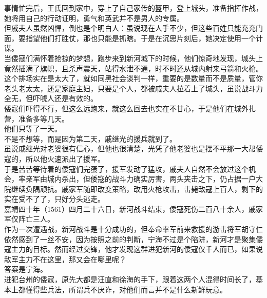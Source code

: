 \begin{multicols}{\theparacolNo}
事情忙完后，王氏回到家中，穿上了自己家传的盔甲，登上城头，准备指挥作战，她将用自己的行动证明，勇气和英武并不是男人的专属。\\

但戚夫人虽然凶悍，倒也是个明白人：虽说现在人手不少，但这些百姓只能充充门面，要指望他们打胜仗，那也只能是抓瞎。于是在沉思片刻后，她决定使用一个计谋。\\

当倭寇们满怀着抢掠的梦想，跑步来到新河城下的时候，他们惊奇地发现，城头上竟然插满了旗帜，且杀声震天，站得水泄不通，时不时还从城内射来弓箭和火枪。\\

这个排场实在是太大了，就如同黑社会谈判一样，重要的是数量而不是质量，管你老头老太太，还是家庭主妇，只要是个人，都被戚夫人拉着上了城头，虽说战斗力全无，但吓唬人还是有效的。\\

倭寇们吓得不行，但这么远跑来，就这么回去也实在不甘心，于是他们在城外扎营，准备多等几天。\\

他们只等了一天。\\

不是不想等，而是因为第二天，戚继光的援兵就到了。\\

虽说戚继光对老婆很有信心，但他也很清楚，光凭了他老婆也是摆不平那一大帮倭寇的，所以他火速派出了援军。\\

于是苦苦等待着的倭寇们完蛋了，援军发动了猛攻，戚夫人自然不会放过这个机会，率亲军由城内杀出，但倭寇的战斗力确实厉害，两头夹击之下，仍占据一户大院继续负隅顽抗。戚家军随即改变策略，改用火枪攻击，击毙敌寇上百人，剩下的实在受不了了，只好分头逃走。\\

嘉靖四十年（1561）四月二十六日，新河战斗结束，倭寇死伤二百八十余人，戚家军仅阵亡三人。\\

作为一次遭遇战，新河战斗是十分成功的，但奉命率军前来救援的游击将军胡守仁依然感到了一丝不安，因为按照之前的判断，宁海不过是个陷阱，新河才是聚集倭寇主力的目标。然而经过交锋，他才发现这群进犯新河的倭寇仅千人而已，如果说敌军主力不在这里，那又会在哪里呢？\\

答案是宁海。\\

进犯台州的倭寇，原先大都是汪直和徐海的手下，跟着这两个人混得时间长了，基本上都懂得些兵法，所谓兵不厌诈，对他们而言并不是什么新鲜玩意。\\


\end{multicols}
